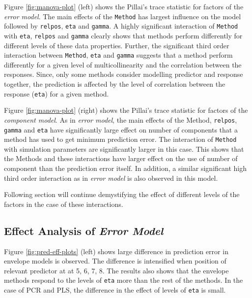 \documentclass[12pt,3p,authoryear]{elsarticle}
\providecommand{\tightlist}{%
  \setlength{\itemsep}{0pt}\setlength{\parskip}{0pt}}
\begin{document}
\begin{description}
\tightlist
\item[\emph{Error Model}:]
Figure \ref{fig:manova-plot} (left) shows the Pillai's trace statistic
for factors of the \emph{error model}. The main effects of the
\texttt{Method} has largest influence on the model followed by
\texttt{relpos}, \texttt{eta} and \texttt{gamma}. A highly significant
interaction of \texttt{Method} with \texttt{eta}, \texttt{relpos} and
\texttt{gamma} clearly shows that methods perform differently for
different levels of these data properties. Further, the significant
third order interaction between \texttt{Method}, \texttt{eta} and
\texttt{gamma} suggests that a method perform differently for a given
level of multicollinearity and the correlation between the responses.
Since, only some methods consider modelling predictor and response
together, the prediction is affected by the level of correlation between
the response (\texttt{eta}) for a given method.
\item[\emph{Component Model}:]
Figure \ref{fig:manova-plot} (right) shows the Pillai's trace statistic
for factors of the \emph{component model}. As in \emph{error model}, the
main effects of the Method, \texttt{relpos}, \texttt{gamma} and
\texttt{eta} have significantly large effect on number of components
that a method has used to get minimum prediction error. The interaction
of \texttt{Method} with simulation parameters are significantly larger
in this case. This shows that the Methods and these interactions have
larger effect on the use of number of component than the prediction
error itself. In addition, a similar significant high third order
interaction as in \emph{error model} is also observed in this model.
\end{description}

Following section will continue demystifying the effect of different
levels of the factors in the case of these interactions.

\hypertarget{effect-analysis-of-error-model}{%
\subsection{\texorpdfstring{Effect Analysis of \emph{Error
Model}}{Effect Analysis of Error Model}}\label{effect-analysis-of-error-model}}

Figure \ref{fig:pred-eff-plots} (left) shows large difference in
prediction error in envelope models is observed. The difference is
intensified when position of relevant predictor at at 5, 6, 7, 8. The
results also shows that the envelope methods respond to the levels of
\texttt{eta} more than the rest of the methods. In the case of PCR and
PLS, the difference in the effect of levels of \texttt{eta} is small.
\end{document}
